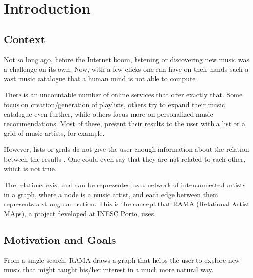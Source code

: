 
\chapter{Introduction} \label{chap:intro}


\section*{}

\section{Context} \label{sec:context}


  Not so long ago, before the Internet boom, listening or discovering new music was a challenge on its own.
  Now, with a few clicks one can have on their hands such a vast music catalogue that a human mind is not able to compute.

  There is an uncountable number of online services that offer exactly that.
  Some focus on creation/generation of playlists, others try to expand their music catalogue even further, while others focus more on personalized music recommendations.
  Most of these, present their results to the user with a list or a grid of music artists, for example.


  However, lists or grids do not give the user enough information about the relation between the results \cite{Lamere2008}.
  One could even say that they are not related to each other, which is not true.

  The relations exist and can be represented as a network of interconnected artists in a graph, where a node is a music artist, and each edge between them represents a strong connection.
  This is the concept that RAMA (Relational Artist MAps), a project developed at INESC Porto, uses. \cite{Costa2008} \cite{Sarmento2009} \cite{Costa2009} \cite{Gouyon2011}

\section{Motivation and Goals} \label{sec:goals}


  From a single search, RAMA draws a graph that helps the user to explore new music that might caught his/her interest in a much more natural way.


